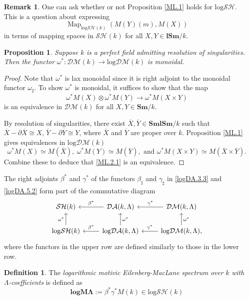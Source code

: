\documentclass[11pt, a4paper]{amsart}
\newtheorem{prop}[thm]{Proposition}
\theoremstyle{definition}
\newtheorem{df}[thm]{Definition}
\newtheorem{rmk}[thm]{Remark}
\numberwithin{equation}{subsection}
\newcommand{\Sm}{\mathbf{Sm}}
\newcommand{\lSm}{\mathbf{lSm}}
\newcommand{\SmlSm}{\mathbf{SmlSm}}
\newcommand{\ol}{\overline}
\newcommand{\spectlogML}{\mathbf{logM\Lambda}}
\newcommand{\infDA}{\mathcal{DA}}
\newcommand{\Map}{\operatorname{Map}}
\newcommand{\infSH}{\mathcal{SH}}
\newcommand{\inflogSH}{\mathrm{log}\mathcal{SH}}
\newcommand{\inflogDA}{\mathrm{log}\mathcal{DA}}
\newcommand{\inflogDM}{\mathrm{log}\mathcal{DM}}
\newcommand{\infDM}{\mathcal{DM}}
\begin{document}
\begin{rmk}
One can ask whether or not Proposition \ref{ML.1} holds for $\inflogSH$.
This is a question about expressing
\[
\Map_{\inflogSH(k)}(M(Y)(m),M(X))
\]
in terms of mapping spaces in $\infSH(k)$ for all $X,Y\in \lSm/k$.
\end{rmk}


\begin{prop}
\label{ML.2}
Suppose $k$ is a perfect field admitting resolution of singularities.
Then the functor $\omega^*\colon \infDM(k)\to \inflogDM(k)$ is monoidal.
\end{prop}
\begin{proof}
Note that $\omega^*$ is lax monoidal since it is right adjoint to the monoidal functor $\omega_\sharp$.
To show $\omega^*$ is monoidal, it suffices to show that the map
\begin{equation}
\label{ML.2.1}
\omega^*M(X)\otimes \omega^*M(Y) \to \omega^*M(X\times Y)
\end{equation}
is an equivalence in $\infDM(k)$ for all $X,Y\in \Sm/k$.

By resolution of singularities, 
there exist $\ol{X},\ol{Y}\in \SmlSm/k$ such that $\ol{X}-\partial\ol{X}\cong X$, 
$\ol{Y}-\partial\ol{Y}\cong Y$, 
where $\ol{X}$ and $\ol{Y}$ are proper over $k$.
Proposition \ref{ML.1} gives equivalences in $\inflogDM(k)$
\[
\omega^*M(X)
\simeq
M(\ol{X}),
\;
\omega^*M(Y)
\simeq
M(\ol{Y}),
\text{ and }
\omega^*M(X\times Y)
\simeq
M(\ol{X}\times \ol{Y}).
\]
Combine these to deduce that \eqref{ML.2.1} is an equivalence.
\end{proof}

The right adjoints $\beta^*$ and $\gamma^*$ of the functors $\beta_\sharp$ and $\gamma_\sharp$ 
in \eqref{logDA.3.3} and \eqref{logDA.5.2} form part of the commutative diagram
\[
\begin{tikzcd}
\infSH(k)\ar[r,"\beta^*",leftarrow]\ar[d,"\omega^*"',leftarrow]&
\infDA(k,\Lambda)\ar[r,"\gamma^*",leftarrow]\ar[d,"\omega^*",leftarrow]&
\infDM(k,\Lambda)\ar[d,"\omega^*",leftarrow]
\\
\inflogSH(k)\ar[r,"\beta^*",leftarrow]&
\inflogDA(k,\Lambda)\ar[r,"\gamma^*",leftarrow]&
\inflogDM(k,\Lambda),
\end{tikzcd}
\]
where the functors in the upper row are defined similarly to those in the lower row.

\begin{df}
The \emph{logarithmic motivic Eilenberg-MacLane spectrum over $k$ with 
$\Lambda$-coefficients}\index[notation]{logML @ $\spectlogML$} 
is defined as 
\[
\spectlogML
:=
\beta^*\gamma^*M(k)\in \inflogSH(k)
\]
\end{df}
\end{document}
